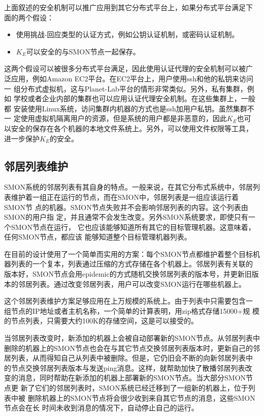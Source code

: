 上面叙述的安全机制可以推广应用到其它分布式平台上，如果分布式平台满足下
面的两个假设：

\begin{itemize}
  \item 使用挑战-回应类型的认证方式，例如公钥认证机制，或密码认证机制。
  
  \item $K_E$可以安全的与SMON节点一起保存。
\end{itemize}

这两个假设可以被很多分布式平台满足，因此使用认证代理的安全机制可以被广
泛应用，例如Amazon EC2平台。在EC2平台上，用户使用ssh和他的私钥来访问一
组分布式虚拟机，这与Planet-Lab平台的情形非常类似。另外，私有集群，例如
学校或者企业内部的集群也可以应用认证代理安全机制。在这些集群上，一般都
安装使用Linux系统，访问集群内机器的方式也是ssh加用户私钥。虽然集群不一
定使用虚拟机隔离用户的资源，但是系统的用户都是非恶意的，因此$K_E$也可
以安全的保存在各个机器的本地文件系统上。另外，可以使用文件权限等工具，
进一步保护$K_E$的安全。

\subsection{邻居列表维护}

SMON系统的邻居列表有其自身的特点。一般来说，在其它分布式系统中，邻居列
表维护着一组正在运行的节点，而在SMON中，邻居列表是一组应该运行着SMON节
点的机器。SMON节点失败并不会影响邻居列表的内容。这个列表由SMON的用户指
定，并且通常不会发生改变。另外SMON系统要求，即使只有一个SMON节点在运行，
它也应该能够知道所有其它的目标管理机器。这意味着，任何SMON节点，都应该
能够知道整个目标管理机器列表。

在目前的设计使用了一个简单而实用的方案：每个SMON节点都维护着整个目标机
器列表的一个复本，列表通过压缩的方式存储在各个机器上。邻居列表有关联的
版本好，SMON节点会用epidemic的方式随机交换邻居列表的版本号，并更新旧版
本的邻居列表。通过改变邻居列表，用户可以改变SMON运行在哪些机器上。

这个邻居列表维护方案足够应用在上万规模的系统上。由于列表中只需要包含一
组节点的IP地址或者主机名称，一个简单的计算表明，用zip格式存储15000+规
模的节点列表，只需要大约100K的存储空间，这是可以接受的。

当邻居列表改变时，新添加的机器上会被自动部署新的SMON节点。从邻居列表中
删除的机器上的SMON节点也会在与其它节点交换邻居列表版本时，更新自己的邻
居列表，从而得知自己从列表中被删除。但是，它仍旧会不断的向新邻居列表中
的节点交换邻居列表版本与发送ping消息。这样，就帮助加快了散播邻居列表改
变的消息，同时帮助在新添加的机器上部署新的SMON节点。当大部分SMON节点更
新了它们的邻居列表时，SMON系统已经迁移到了一组新的机器上，位于列表中被
删除机器上的SMON节点将会很少收到来自其它节点的消息，这些SMON节点会在长
时间未收到消息的情况下，自动停止自己的运行。

